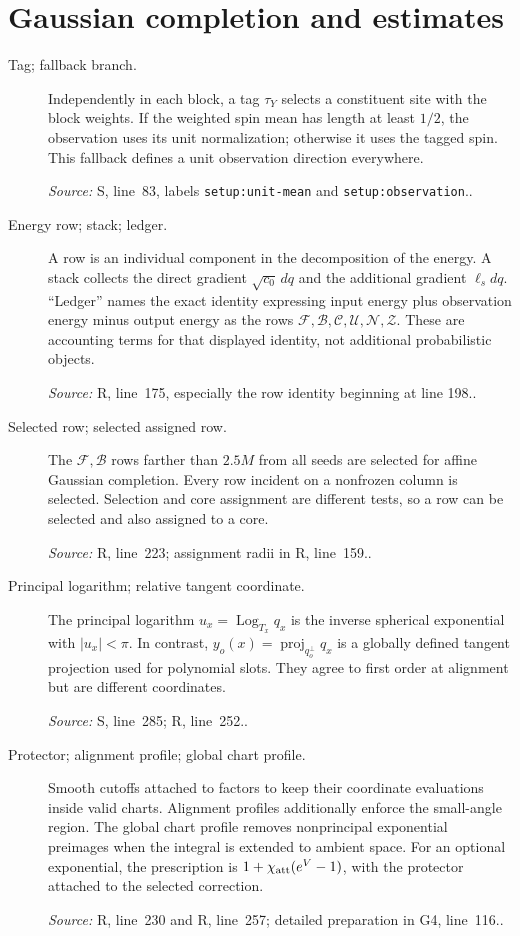 \documentclass[11pt]{article}
\newcommand{\src}[2]{\textsf{#1}, line~#2}
\newcommand{\where}[1]{\par{\small\textit{Source:} #1.}}
\begin{document}
\section*{Gaussian completion and estimates}
\begin{description}
\item[Tag; fallback branch.]
Independently in each block, a tag \(\tau_Y\) selects a constituent
site with the block weights.  If the weighted spin mean has length
at least \(1/2\), the observation uses its unit normalization;
otherwise it uses the tagged spin.  This fallback defines a unit
observation direction everywhere.
\where{\src{S}{83}, labels \texttt{setup:unit-mean} and
\texttt{setup:observation}.}

\item[Energy row; stack; ledger.]
A row is an individual component in the decomposition of the energy.
A stack collects the direct gradient \(\sqrt{c_0}\,dq\) and the
additional gradient \(\ell_s dq\).  ``Ledger'' names the exact
identity expressing input energy plus observation energy minus output
energy as the rows \(\mathcal F,\mathcal B,\mathcal C,\mathcal U,
\mathcal N,\mathcal Z\).  These are accounting terms for that displayed
identity, not additional probabilistic objects.
\where{\src{R}{175}, especially the row identity beginning at line 198.}

\item[Selected row; selected assigned row.]
The \(\mathcal F,\mathcal B\) rows farther than \(2.5M\) from
all seeds are selected for affine Gaussian completion.  Every row
incident on a nonfrozen column is selected.  Selection and core
assignment are different tests, so a row can be selected and also
assigned to a core.
\where{\src{R}{223}; assignment radii in \src{R}{159}.}

\item[Principal logarithm; relative tangent coordinate.]
The principal logarithm \(u_x=\operatorname{Log}_{T_x}q_x\) is the
inverse spherical exponential with \(|u_x|<\pi\).  In contrast,
\(y_o(x)=\operatorname{proj}_{q_o^\perp}q_x\) is a globally defined
tangent projection used for polynomial slots.  They agree to first
order at alignment but are different coordinates.
\where{\src{S}{285}; \src{R}{252}.}

\item[Protector; alignment profile; global chart profile.]
Smooth cutoffs attached to factors to keep their coordinate evaluations
inside valid charts.  Alignment profiles additionally enforce the
small-angle region.  The global chart profile removes nonprincipal
exponential preimages when the integral is extended to ambient space.
For an optional exponential, the prescription is
\(1+\chi_{\rm att}(e^V-1)\), with the protector attached to the
selected correction.
\where{\src{R}{230} and \src{R}{257}; detailed preparation in \src{G4}{116}.}


\end{description}
\end{document}
